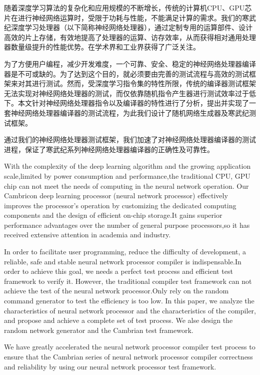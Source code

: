 ﻿\begin{cnabstract}
随着深度学习算法的复杂化和应用规模的不断增长，传统的计算机CPU、GPU芯片在进行神经网络运算时，受限于功耗与性能，不能满足计算的需求。我们的寒武纪深度学习处理器（以下简称神经网络处理器），通过定制专用的运算部件、设计高效的片上存储，有效地提高了处理器的运算、访存效率，从而获得相对通用处理器数量级提升的性能优势。在学术界和工业界获得了广泛关注。

为了方便用户编程，减少开发难度，一个可靠、安全、稳定的神经网络处理器编译器是不可或缺的。为了达到这个目的，就必须要由完善的测试流程与高效的测试框架来对其进行测试。然而，受深度学习指令集的特性所限，传统的编译器测试框架无法实现对神经网络处理器的测试，而仅依靠随机指令产生器进行测试效率过于低下。本文针对神经网络处理器指令以及编译器的特性进行了分析，提出并实现了一套神经网络处理器编译器的测试流程，为此我们设计了随机网络生成器及寒武纪测试框架。

通过我们的神经网络处理器测试框架，我们加速了对神经网络处理器编译器的测试进程，保证了寒武纪系列神经网络处理器编译器的正确性及可靠性。

\end{cnabstract}

\begin{enabstract}
With the complexity of the deep learning algorithm and the growing application scale,limited by power consumption and performance,the traditional CPU, GPU chip can not meet the needs of computing in the neural network operation. Our Cambricon deep learning processor (neural network processor) effectively improves the processor's operation by customizing the dedicated computing components and the design of efficient on-chip storage.It gains superior performance advantages over the number of general purpose processors,so it has received extensive attention in academia and industry.

In order to facilitate user programming, reduce the difficulty of development, a reliable, safe and stable neural network processor compiler is indispensable.In order to achieve this goal, we needs a perfect test process and efficient test framework to verify it. However, the traditional compiler test framework can not achieve the test of the neural network processor.Only rely on the random command generator to test the efficiency is too low. In this paper, we analyze the characteristics of neural network processor and the characteristics of the compiler, and propose and achieve a complete set of test process. We alse design the random network generator and the Cambrian test framework.

We have greatly accelerated the neural network processor compiler test process to ensure that the Cambrian series of neural network processor compiler correctness and reliability by using our neural network processor test framework.

\end{enabstract}
